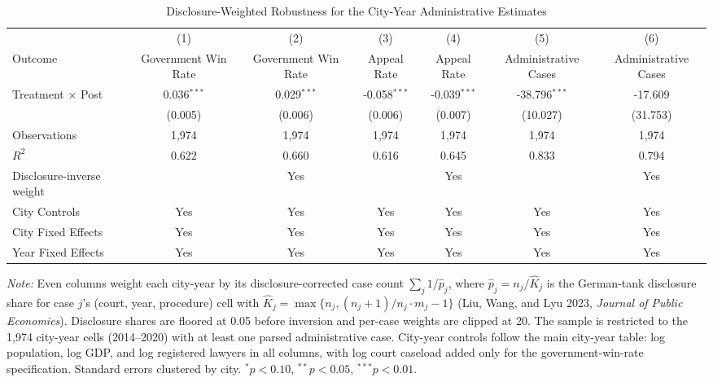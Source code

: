 \begin{table}[!htbp]
\setlength{\abovecaptionskip}{0pt}
\centering
\caption{Disclosure-Weighted Robustness for the City-Year Administrative Estimates}
\label{tab:city_year_disclosure_weighted_appendix}
\begin{threeparttable}
\begin{tabular}{lcccccc}
\toprule
 & (1) & (2) & (3) & (4) & (5) & (6) \\
Outcome & Government Win Rate & Government Win Rate & Appeal Rate & Appeal Rate & Administrative Cases & Administrative Cases \\
\midrule
Treatment $\times$ Post & 0.036$^{***}$ & 0.029$^{***}$ & -0.058$^{***}$ & -0.039$^{***}$ & -38.796$^{***}$ & -17.609 \\
& (0.005) & (0.006) & (0.006) & (0.007) & (10.027) & (31.753) \\
\addlinespace
Observations & 1,974 & 1,974 & 1,974 & 1,974 & 1,974 & 1,974 \\
$R^2$ & 0.622 & 0.660 & 0.616 & 0.645 & 0.833 & 0.794 \\
Disclosure-inverse weight &  & Yes &  & Yes &  & Yes \\
City Controls & Yes & Yes & Yes & Yes & Yes & Yes \\
City Fixed Effects & Yes & Yes & Yes & Yes & Yes & Yes \\
Year Fixed Effects & Yes & Yes & Yes & Yes & Yes & Yes \\
\bottomrule
\end{tabular}
\begin{tablenotes}[flushleft]
\footnotesize
\item \textit{Note:} Even columns weight each city-year by its disclosure-corrected case count $\sum_j 1/\hat{p}_j$, where $\hat{p}_j = n_j / \hat{K}_j$ is the German-tank disclosure share for case $j$'s (court, year, procedure) cell with $\hat{K}_j = \max\{n_j, (n_j+1)/n_j \cdot m_j - 1\}$ (Liu, Wang, and Lyu 2023, \textit{Journal of Public Economics}). Disclosure shares are floored at 0.05 before inversion and per-case weights are clipped at 20. The sample is restricted to the 1,974 city-year cells (2014--2020) with at least one parsed administrative case. City-year controls follow the main city-year table: log population, log GDP, and log registered lawyers in all columns, with log court caseload added only for the government-win-rate specification. Standard errors clustered by city. $^{*}p<0.10$, $^{**}p<0.05$, $^{***}p<0.01$.
\end{tablenotes}
\end{threeparttable}
\end{table}
